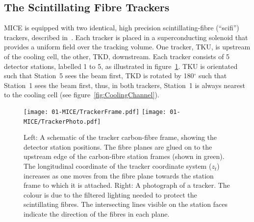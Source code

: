 
  \subsection{The Scintillating Fibre Trackers}
  \label{subsec:Trackers}
  MICE is equipped with two identical, high precision scintillating-fibre (``scifi'') trackers, described in~\cite{MiceTrackers}. Each tracker is placed in a superconducting solenoid that provides a uniform field over the tracking volume. One tracker, TKU, is upstream of the cooling cell, the other, TKD, downstream.  Each tracker consists of 5 detector stations, labelled 1 to 5, as illustrated in figure~\ref{fig:Trackers}. TKU is orientated such that Station~5 sees the beam first, TKD is rotated by 180$^\circ$ such that Station~1 sees the beam first, thus, in both trackers, Station~1 is always nearest to the cooling cell (see figure~\ref{fig:CoolingChannel}).
  
  \begin{figure}[tbh]
    \centering
    \texttt{[image: 01-MICE/TrackerFrame.pdf]} \hspace{2pc}%
    \texttt{[image: 01-MICE/TrackerPhoto.pdf]}
    \caption{\label{fig:Trackers} Left: A schematic of the tracker carbon-fibre frame, showing the detector station positions.  The fibre planes are glued on to the upstream edge of the carbon-fibre station frames (shown in green). The longitudinal coordinate of the tracker coordinate system ($z_t$) increases as one moves from the fibre plane towards the station frame to which it is attached.  Right: A photograph of a tracker. The colour is due to the filtered lighting needed to protect the scintillating fibres. The intersecting lines visible on the station faces indicate the direction of the fibres in each plane.}
  \end{figure}

